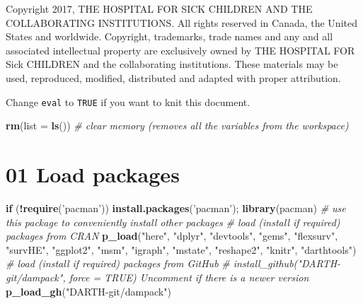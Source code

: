 \documentclass[
]{article}
\newenvironment{Shaded}{\begin{snugshade}}{\end{snugshade}}
\newcommand{\CommentTok}[1]{\textcolor[rgb]{0.56,0.35,0.01}{\textit{#1}}}
\newcommand{\ControlFlowTok}[1]{\textcolor[rgb]{0.13,0.29,0.53}{\textbf{#1}}}
\newcommand{\DataTypeTok}[1]{\textcolor[rgb]{0.13,0.29,0.53}{#1}}
\newcommand{\KeywordTok}[1]{\textcolor[rgb]{0.13,0.29,0.53}{\textbf{#1}}}
\newcommand{\NormalTok}[1]{#1}
\newcommand{\OperatorTok}[1]{\textcolor[rgb]{0.81,0.36,0.00}{\textbf{#1}}}
\newcommand{\StringTok}[1]{\textcolor[rgb]{0.31,0.60,0.02}{#1}}
\begin{document}
Copyright 2017, THE HOSPITAL FOR SICK CHILDREN AND THE COLLABORATING
INSTITUTIONS. All rights reserved in Canada, the United States and
worldwide. Copyright, trademarks, trade names and any and all associated
intellectual property are exclusively owned by THE HOSPITAL FOR Sick
CHILDREN and the collaborating institutions. These materials may be
used, reproduced, modified, distributed and adapted with proper
attribution.

\newpage

Change \texttt{eval} to \texttt{TRUE} if you want to knit this document.

\begin{Shaded}
\begin{Highlighting}[]
\KeywordTok{rm}\NormalTok{(}\DataTypeTok{list =} \KeywordTok{ls}\NormalTok{())      }\CommentTok{# clear memory (removes all the variables from the workspace)}
\end{Highlighting}
\end{Shaded}

\hypertarget{load-packages}{%
\section{01 Load packages}\label{load-packages}}

\begin{Shaded}
\begin{Highlighting}[]
\ControlFlowTok{if}\NormalTok{ (}\OperatorTok{!}\KeywordTok{require}\NormalTok{(}\StringTok{'pacman'}\NormalTok{)) }\KeywordTok{install.packages}\NormalTok{(}\StringTok{'pacman'}\NormalTok{); }\KeywordTok{library}\NormalTok{(pacman) }\CommentTok{# use this package to conveniently install other packages}
\CommentTok{# load (install if required) packages from CRAN}
\KeywordTok{p_load}\NormalTok{(}\StringTok{"here"}\NormalTok{, }\StringTok{"dplyr"}\NormalTok{, }\StringTok{"devtools"}\NormalTok{, }\StringTok{"gems"}\NormalTok{, }\StringTok{"flexsurv"}\NormalTok{, }\StringTok{"survHE"}\NormalTok{, }\StringTok{"ggplot2"}\NormalTok{, }\StringTok{"msm"}\NormalTok{, }\StringTok{"igraph"}\NormalTok{, }\StringTok{"mstate"}\NormalTok{, }\StringTok{"reshape2"}\NormalTok{, }\StringTok{"knitr"}\NormalTok{, }\StringTok{"darthtools"}\NormalTok{)  }
\CommentTok{# load (install if required) packages from GitHub}
\CommentTok{# install_github("DARTH-git/dampack", force = TRUE) Uncomment if there is a newer version}
\KeywordTok{p_load_gh}\NormalTok{(}\StringTok{"DARTH-git/dampack"}\NormalTok{)}
\end{Highlighting}
\end{Shaded}
\end{document}
